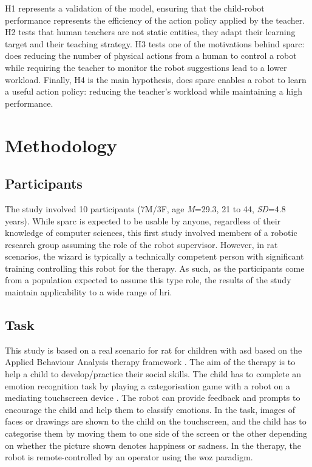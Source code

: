 H1 represents a validation of the model, ensuring that the child-robot performance represents the efficiency of the action policy applied by the teacher. H2 tests that human teachers are not static entities, they adapt their learning target and their teaching strategy. H3 tests one of the motivations behind \gls{sparc}: does reducing the number of physical actions from a human to control a robot while requiring the teacher to monitor the robot suggestions lead to a lower workload. Finally, H4 is the main hypothesis, does \gls{sparc} enables a robot to learn a useful action policy: reducing the teacher's workload while maintaining a high performance.

\section{Methodology}

\subsection{Participants}

The study involved 10 participants (7M/3F, age \textit{M}=29.3, 21 to 44, \textit{SD}=4.8 years). While \gls{sparc} is expected to be usable by anyone, regardless of their knowledge of computer sciences, this first study involved members of a robotic research group assuming the role of the robot supervisor. However, in \gls{rat} scenarios, the wizard is typically a technically competent person with significant training controlling this robot for the therapy. As such, as the participants come from a population expected to assume this type role, the results of the study maintain applicability to a wide range of \gls{hri}.

\subsection{Task}

This study is based on a real scenario for \gls{rat} for children with \gls{asd} based on the Applied Behaviour Analysis therapy framework \citep{cooper2007applied}. The aim of the therapy is to help a child to develop/practice their social skills. The child has to complete an emotion recognition task by playing a categorisation game with a robot on a mediating touchscreen device \citep{baxter2012touchscreen}. The robot can provide feedback and prompts to encourage the child and help them to classify emotions. In the task, images of faces or drawings are shown to the child on the touchscreen, and the child has to categorise them by moving them to one side of the screen or the other depending on whether the picture shown denotes happiness or sadness. In the therapy, the robot is remote-controlled by an operator using the \gls{woz} paradigm.%

